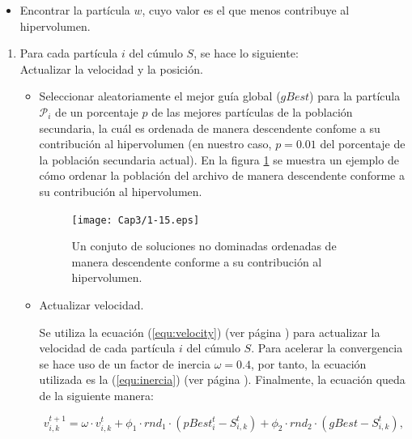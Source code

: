 \begin{enumerate}
\begin{itemize}
      \item Encontrar la part\'icula $w$, cuyo valor es el que menos contribuye al hipervolumen.
      \end{itemize}
      
\begin{enumerate}
  \item Para cada part\'icula $i$ del c\'umulo $S$, se hace lo siguiente: \\
    
    Actualizar la  velocidad y la posici\'on.
    
    \begin{itemize}
             
      \item Seleccionar aleatoriamente el mejor gu\'ia global ($gBest$) para la part\'icula $\mathcal{P}_i$ de un porcentaje $p$
      de las mejores part\'iculas de la poblaci\'on secundaria, la cu\'al es ordenada de manera descendente confome a su 
      contribuci\'on al hipervolumen (en nuestro caso, $p=0.01$ del porcentaje de la poblaci\'on secundaria actual). 
      En la figura \ref{fig:ordenado} se muestra un ejemplo de c\'omo ordenar la poblaci\'on del archivo de manera descendente 
      conforme a su contribuci\'on al hipervolumen. 

      \begin{figure}
      \begin{center}
	  \texttt{[image: Cap3/1-15.eps]}
      \end{center}
	\caption[Ejemplo de soluciones no dominadas ordenadas]{Un conjuto de soluciones no dominadas ordenadas de manera 
	descendente conforme a su contribuci\'on al hipervolumen.}
      \label{fig:ordenado}
      \end{figure}
      
      \item Actualizar velocidad. 
      
      Se utiliza la ecuaci\'on (\ref{equ:velocity}) (ver p\'agina \pageref{equ:velocity}) 
      para actualizar la velocidad de cada part\'icula $i$ del c\'umulo $S$. Para acelerar la convergencia 
      se hace uso de un factor de inercia $\omega = 0.4$, por tanto, la ecuaci\'on utilizada es la
      (\ref{equ:inercia}) (ver p\'agina \pageref{equ:inercia}). Finalmente, la ecuaci\'on queda de la siguiente 
      manera:	
      
       \[v^{t+1}_{i,k} = \omega \cdot v^t_{i,k} + \phi_1 \cdot rnd_1 \cdot \left(pBest^t_i - S^t_{i,k} \right) 
					    + \phi_2 \cdot rnd_2 \cdot \left(gBest - S^t_{i,k} \right),\]
      

\end{itemize}
\end{enumerate}
\end{enumerate}
